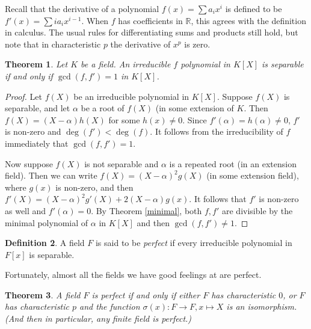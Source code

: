 \documentclass[12pt]{report}
\newtheorem{thm}{Theorem}[section]
\theoremstyle{definition}
\newtheorem{defn}[thm]{Definition}
\def\RR{\mathbb{R}}
\def\aa{\alpha}
\begin{document}
Recall that the derivative of a polynomial $f(x)=\sum a_i x^i$ is defined to be $f'(x) = \sum ia_ix^{i-1}$. When $f$ has coefficients in $\RR$, this agrees with the definition in calculus. The usual rules for differentiating sums and products still hold, but note that in characteristic $p$ the derivative of $x^p$ is zero.

\begin{thm}\label{sep}
    Let $K$ be a field. An irreducible $f$ polynomial in $K[X]$ is separable if and only if $\gcd(f,f')=1$ in $K[X]$.
\end{thm}

\begin{proof}
    Let $f(X)$ be an irreducible polynomial in $K[X]$. Suppose $f(X)$ is separable, and let $\aa$ be a root of $f(X)$ (in some extension of $K$. Then $f(X) = (X -\aa)h(X)$ for some $h(x)\not=0$. Since $f'(\aa)=h(\aa)\not=0$, $f'$ is non-zero and $\deg(f')<\deg(f)$. It follows from the irreducibility of $f$ immediately that $\gcd(f,f')=1$.

    Now suppose $f(X)$ is not separable and $\aa$ is a repeated root (in an extension field). Then we can write $f(X)=(X-\aa)^2g(X)$ (in some extension field), where $g(x)$ is non-zero, and then  $f'(X)= (X-\aa)^2g'(X)+2(X-\aa)g(x)$. It follows that $f'$ is non-zero as well and $f'(\aa)=0$. By Theorem \ref{minimal}, both $f,f'$ are divisible by the minimal polynomial of $\aa$ in $K[X]$ and then $\gcd(f,f')\not=1$.
\end{proof}

\begin{defn}
    A field $F$ is said to be \emph{perfect} if every irreducible polynomial in $F[x]$ is separable.
\end{defn}

Fortunately, almost all the fields we have good feelings at are perfect. 

\begin{thm}
    A field $F$ is perfect if and only if either $F$ has characteristic $0$, or $F$ has characteristic $p$ and the function $\sigma(x): F\to F, x\mapsto X$ is an isomorphism. (And then in particular, any finite field is perfect.)
\end{thm}
\end{document}
